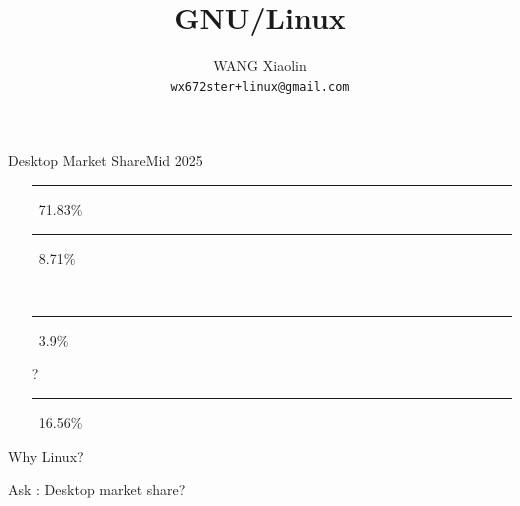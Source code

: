 \usepackage{worldflags}
\newcommand{\GG}{\textcolor{SkyBlue}{\nerd }}
\newcommand{\world}{\textcolor{SkyBlue}{\nerd 🌎}}%
\newcommand{\linux}{{\nerd }}
\newcommand{\openbook}{{\nerd }}

\title{GNU/Linux}

\author{WANG Xiaolin\\%
  {\footnotesize\texttt{wx672ster+linux@gmail.com}}}




\frame{\titlepage}

\begin{frame}{Desktop Market Share}{Mid 2025}
  \begin{itemize}
  \item[\win] \textcolor{SkyBlue}{\rule{.7183\textwidth}{2mm}}\,
    71.83\%    
  \item[\apple] \textcolor{LightGray}{\rule{.0871\textwidth}{2mm}}\,
    8.71\%
  \item[\linux] \rule{.039\textwidth}{2mm}\, 3.9\%
  \item[?] \textcolor{Green}{\rule{.1656\textwidth}{2mm}}\, 16.56\%
  \end{itemize}

  \begin{center}
    \Huge\purisa Why Linux?
  \end{center}
  \vfill
  \begin{flushright}\footnotesize
  Ask \chatgpt{}: Desktop market share?
  \end{flushright}
\end{frame}

